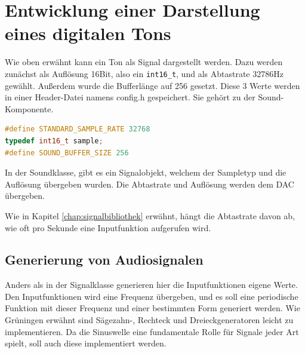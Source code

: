 \section{Entwicklung einer Darstellung eines digitalen Tons}
\label{chap:digitale_ton_darstellung}

Wie oben erwähnt kann ein Ton als Signal dargestellt werden. Dazu
werden zunächst als Auflösung 16Bit, also ein \lstinline|int16_t|,
und als Abtastrate 32786Hz gewählt. Außerdem wurde die Bufferlänge auf 256 gesetzt. 
Diese 3 Werte werden in einer Header-Datei namens config.h gespeichert. Sie
gehört zu der Sound-Komponente.

\begin{lstlisting}[language=C++, 
                       frame=single, 
                       caption={Standardparameter eines Soundobjekts},
                       captionpos=b]
#define STANDARD_SAMPLE_RATE 32768
typedef int16_t sample;
#define SOUND_BUFFER_SIZE 256
\end{lstlisting}

In der Soundklasse, gibt es ein Signalobjekt, welchem der Sampletyp
und die Auflösung übergeben wurden. Die Abtastrate und Auflösung werden
dem DAC übergeben.

Wie in Kapitel \ref{chap:signalbibliothek} erwähnt, hängt die Abtastrate davon ab,
wie oft pro Sekunde eine Inputfunktion aufgerufen wird.

\subsection{Generierung von Audiosignalen}
Anders als in der Signalklasse generieren hier die Inputfunktionen 
eigene Werte. Den Inputfunktionen wird eine Frequenz übergeben, und es
soll eine periodische Funktion mit dieser Frequenz und einer bestimmten
Form generiert werden. Wie Grüningen \cite[7.1]{grueningen2008dsv} 
erwähnt sind Sägezahn-, Rechteck und Dreieckgeneratoren leicht zu 
implementieren. Da die Sinuswelle eine fundamentale Rolle für Signale
jeder Art spielt, soll auch diese implementiert werden.

